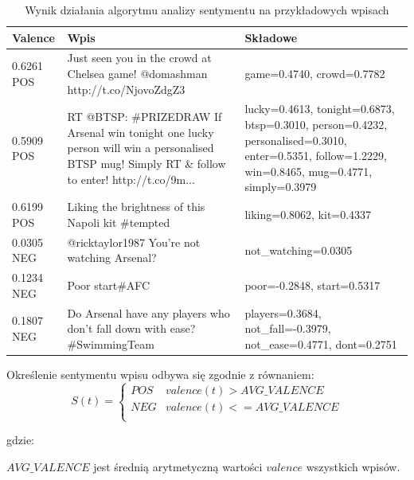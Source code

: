\begin{table}[ht!]
\begin{center}  
\begin{tabular}{|p{12mm}|p{70mm}|>{\raggedright\arraybackslash}p{60mm}|}
\hline
Valence & Wpis & Składowe 
\\ \hline 
0.6261 POS & Just seen you in the crowd at Chelsea game! @domashman http://t.co/NjovoZdgZ3 & {game=0.4740, crowd=0.7782}
\\ \hline
0.5909 POS & RT @BTSP: \#PRIZEDRAW If Arsenal win tonight one lucky person
will win a personalised BTSP mug! Simply RT \& follow to enter!
http://t.co/9m... & {lucky=0.4613, tonight=0.6873, btsp=0.3010, person=0.4232, personalised=0.3010, enter=0.5351, follow=1.2229, win=0.8465, mug=0.4771, simply=0.3979}
\\ \hline
0.6199 POS & Liking the brightness of this Napoli kit \#tempted &
{liking=0.8062, kit=0.4337} \\ \hline
0.0305 NEG & @ricktaylor1987 You're not watching Arsenal? &
{not\_watching=0.0305} \\ \hline
0.1234 NEG & Poor start\#AFC & {poor=-0.2848, start=0.5317}
\\ \hline
0.1807 NEG & Do Arsenal have any players who don't fall down with ease?
\#SwimmingTeam & {players=0.3684, not\_fall=-0.3979, not\_ease=0.4771,
dont=0.2751} \\ \hline
\end{tabular} 
\end{center} 
\caption{Wynik działania algorytmu analizy sentymentu na przykładowych wpisach}
\label{tab:valence-przyklad}
\end{table}

Określenie sentymentu wpisu odbywa się zgodnie z równaniem:
\begin{equation}
S(t) =
\begin{cases}
POS & valence(t) > AVG\_VALENCE \\
NEG & valence(t) <= AVG\_VALENCE \\
\end{cases}
\end{equation}

gdzie:

$AVG\_VALENCE$ jest średnią arytmetyczną wartości $valence$ wszystkich wpisów.

